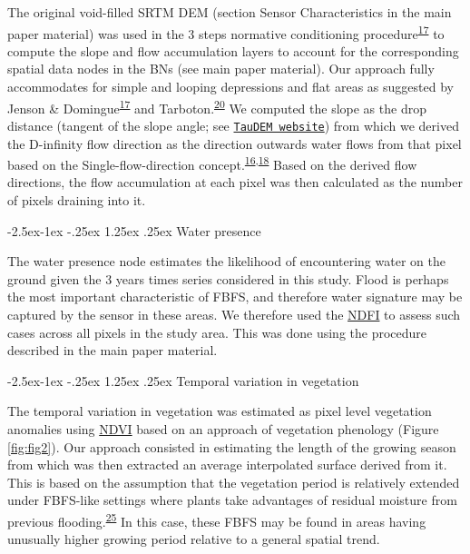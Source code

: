 \documentclass[12pt,oneside]{article}
\makeatletter
\renewcommand\paragraph{\@startsection{paragraph}{4}{\z@}%
            {-2.5ex\@plus -1ex \@minus -.25ex}%
            {1.25ex \@plus .25ex}%
            {\normalfont\normalsize\bfseries}}
\makeatother
\begin{document}
The original void-filled SRTM DEM (section Sensor Characteristics in the main paper material) was used in the 3 steps normative conditioning procedure\textsuperscript{\protect\hyperlink{ref-Jenson_and_Domingue_1988}{17}} to compute the slope and flow accumulation layers to account for the corresponding spatial data nodes in the BNs (see main paper material). Our approach fully accommodates for simple and looping depressions and flat areas as suggested by Jenson \& Domingue\textsuperscript{\protect\hyperlink{ref-Jenson_and_Domingue_1988}{17}} and Tarboton.\textsuperscript{\protect\hyperlink{ref-Tarboton_et_al_1991}{20}} We computed the slope as the drop distance (tangent of the slope angle; see \href{http://hydrology.usu.edu/taudem/taudem5/documentation.html}{\texttt{TauDEM\ website}}) from which we derived the D-infinity flow direction as the direction outwards water flows from that pixel based on the Single-ﬂow-direction concept.\textsuperscript{\protect\hyperlink{ref-Arge_et_al_2003}{16},\protect\hyperlink{ref-Tarboton_1997}{18}} Based on the derived flow directions, the flow accumulation at each pixel was then calculated as the number of pixels draining into it.

\hypertarget{I527}{%
\paragraph{Water presence}\label{I527}}

The water presence node estimates the likelihood of encountering water on the ground given the 3 years times series considered in this study. Flood is perhaps the most important characteristic of FBFS, and therefore water signature may be captured by the sensor in these areas. We therefore used the \href{http://journals.plos.org/plosone/article/file?id=10.1371/journal.pone.0088741\&type=printable}{NDFI} to assess such cases across all pixels in the study area. This was done using the procedure described in the main paper material.

\hypertarget{I528}{%
\paragraph{Temporal variation in vegetation}\label{I528}}

The temporal variation in vegetation was estimated as pixel level vegetation anomalies using \href{https://www.sciencedirect.com/science/article/pii/0034425779900130?via\%3Dihub}{NDVI} based on an approach of vegetation phenology (Figure \ref{fig:fig2}). Our approach consisted in estimating the length of the growing season from which was then extracted an average interpolated surface derived from it. This is based on the assumption that the vegetation period is relatively extended under FBFS-like settings where plants take advantages of residual moisture from previous flooding.\textsuperscript{\protect\hyperlink{ref-VanSteenbergen_et_al_2010}{25}} In this case, these FBFS may be found in areas having unusually higher growing period relative to a general spatial trend.
\end{document}
